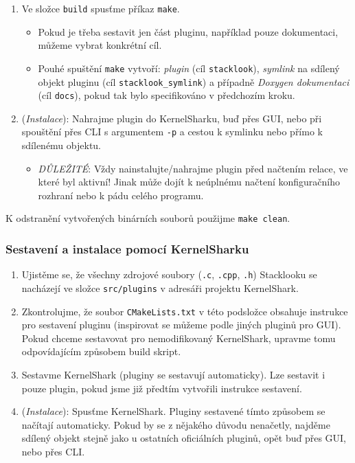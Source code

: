 \begin{enumerate}
  \item Ve složce \texttt{build} spusťme příkaz \texttt{make}.
    \begin{itemize}
      \item Pokud je třeba sestavit jen část pluginu, například pouze dokumentaci, můžeme vybrat konkrétní cíl.
      \item Pouhé spuštění \texttt{make} vytvoří: \emph{plugin} (cíl \texttt{stacklook}), \emph{symlink} na sdílený objekt pluginu (cíl \texttt{stacklook\_symlink}) a případně \emph{Doxygen dokumentaci} (cíl \texttt{docs}), pokud tak bylo specifikováno v předchozím kroku.
    \end{itemize}
  \item (\emph{Instalace}): Nahrajme plugin do KernelSharku, buď přes GUI, nebo při spouštění přes CLI s argumentem \texttt{-p} a cestou k symlinku nebo přímo k sdílenému objektu.
    \begin{itemize}
      \item \emph{DŮLEŽITÉ}: Vždy nainstalujte/nahrajme plugin před načtením relace, ve které byl aktivní! Jinak může dojít k neúplnému načtení konfiguračního rozhraní nebo k pádu celého programu.
    \end{itemize}
\end{enumerate}

K odstranění vytvořených binárních souborů použijme \texttt{make clean}.

\subsubsection{Sestavení a instalace pomocí KernelSharku}

\begin{enumerate}
  \item Ujistěme se, že všechny zdrojové soubory (\texttt{.c}, \texttt{.cpp}, \texttt{.h}) Stacklooku se nacházejí ve složce \texttt{src/plugins} v adresáři projektu KernelShark.
  \item Zkontrolujme, že soubor \texttt{CMakeLists.txt} v této podsložce obsahuje instrukce pro sestavení pluginu (inspirovat se můžeme podle jiných pluginů pro GUI). Pokud chceme sestavovat pro nemodifikovaný KernelShark, upravme tomu odpovídajícím způsobem build skript.
  \item Sestavme KernelShark (pluginy se sestavují automaticky). Lze sestavit i pouze plugin, pokud jsme již předtím vytvořili instrukce sestavení.
  \item (\emph{Instalace}): Spusťme KernelShark. Pluginy sestavené tímto způsobem se načítají automaticky. Pokud by se z nějakého důvodu nenačetly, najděme sdílený objekt stejně jako u ostatních oficiálních pluginů, opět buď přes GUI, nebo přes CLI.
\end{enumerate}

